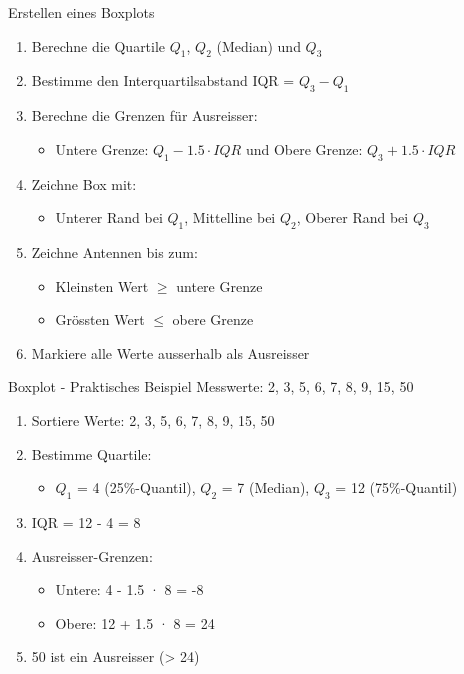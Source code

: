 \begin{KR}{Erstellen eines Boxplots}
\begin{enumerate}
    \item Berechne die Quartile $Q_1$, $Q_2$ (Median) und $Q_3$
    \item Bestimme den Interquartilsabstand IQR = $Q_3 - Q_1$
    \item Berechne die Grenzen für Ausreisser:
        \begin{itemize}
            \item Untere Grenze: $Q_1 - 1.5 \cdot IQR$ und Obere Grenze: $Q_3 + 1.5 \cdot IQR$
        \end{itemize}
    \item Zeichne Box mit:
        \begin{itemize}
            \item Unterer Rand bei $Q_1$, Mittelline bei $Q_2$, Oberer Rand bei $Q_3$
        \end{itemize}
    \item Zeichne Antennen bis zum:
        \begin{itemize}
            \item Kleinsten Wert  $\geqslant$  untere Grenze 
            \item Grössten Wert $\leqslant$  obere Grenze
        \end{itemize}
    \item Markiere alle Werte ausserhalb als Ausreisser
\end{enumerate}
\end{KR}

\begin{example2}{Boxplot - Praktisches Beispiel}
Messwerte: 2, 3, 5, 6, 7, 8, 9, 15, 50
\begin{enumerate}
    \item Sortiere Werte: 2, 3, 5, 6, 7, 8, 9, 15, 50
    \item Bestimme Quartile:
        \begin{itemize}
            \item $Q_1$ = 4 (25\%-Quantil), $Q_2$ = 7 (Median), $Q_3$ = 12 (75\%-Quantil)
        \end{itemize}
    \item IQR = 12 - 4 = 8
    \item Ausreisser-Grenzen:
        \begin{itemize}
            \item Untere: 4 - 1.5 · 8 = -8
            \item Obere: 12 + 1.5 · 8 = 24
        \end{itemize}
    \item 50 ist ein Ausreisser (> 24)
\end{enumerate}
\end{example2}

